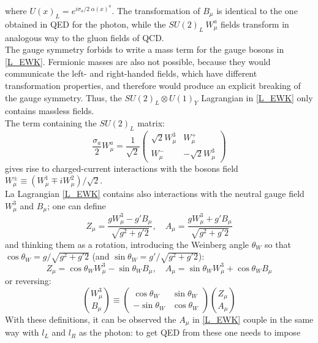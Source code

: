 where $U(x)_{L} = e^{i\sigma_{a} / 2\ \alpha(x)^{a}}$. The transformation of $B_{\mu}$ is identical to the one obtained in QED for the photon, while the $SU(2)_{L}\ W^{a}_{\mu}$ fields transform in analogous way to the gluon fields of QCD. \\
The gauge symmetry forbids to write a mass term for the gauge bosons in \ref{L_EWK}. Fermionic masses are also not possible, because they would communicate the left- and right-handed fields, which have different transformation properties, and therefore would produce an explicit breaking of the gauge symmetry. Thus, the $SU(2)_{L} \otimes U(1)_{Y}$ Lagrangian in \ref{L_EWK} only contains massless fields.\\
The term containing the $SU(2)_{L}$ matrix:
\begin{equation}
\frac{\sigma_{a}}{2}W_{\mu}^{a} = \frac{1}{\sqrt{2}}\begin{pmatrix} \sqrt{2}W^{3}_{\mu} & W_{\mu}^{+} \\ W_{\mu}^{-} & - \sqrt{2}W^{3}_{\mu} \end{pmatrix}
\end{equation}
gives rise to charged-current interactions with the bosons field $W_{\mu}^{\pm} \equiv (W^{1}_{\mu} \mp iW^{2}_{\mu}) / \sqrt{2}$. \\
La Lagrangian \ref{L_EWK}  contains also interactions with the neutral gauge field $W^{3}_{\mu}$ and $B_{\mu}$; one can define
\begin{equation}
Z_{\mu} = \frac{gW^{3}_{\mu} - g'B_{\mu}}	{\sqrt{g^{2}+g'{2}}}, \quad A_{\mu} = \frac{gW^{3}_{\mu} + g'B_{\mu}}	{\sqrt{g^{2}+g'{2}}}
\label{A_Z}
\end{equation}
and thinking them as a rotation, introducing the Weinberg angle $\theta_{W}$ so that $\cos\theta_{W} = g/{\sqrt{g^{2}+g'{2}}}$ (and $\sin\theta_{W} = g'/{\sqrt{g^{2}+g'{2}}}$):
\begin{equation}
Z_{\mu} = \cos\theta_{W}W^{3}_{\mu} - \sin\theta_{W}B_{\mu}, \quad A_{\mu} = \sin\theta_{W}W^{3}_{\mu} + \cos\theta_{W}B_{\mu}
\label{A_Z_2}
\end{equation}
or reversing:
\begin{equation}
{W^{3}_{\mu} \choose B_{\mu}} \equiv \begin{pmatrix} \cos\theta_{W} & \sin\theta_{W} \\ -\sin\theta_{W} & \cos\theta_{W} \end{pmatrix} {Z_{\mu} \choose A_{\mu}}
\label{W_B_A_Z}
\end{equation}
With these definitions, it can be observed the $A_{\mu}$ in \ref{L_EWK} couple in the same way with $l_{L}$ and $l_{R}$ as the photon: to get QED from these one needs to impose
